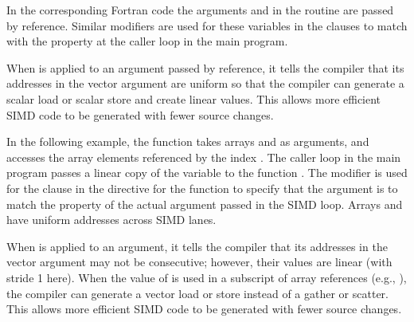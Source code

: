 In the corresponding Fortran code the arguments  and
 in the routine  are passed by reference. 
Similar modifiers are used for these variables in the  clauses
to match with the property at the caller loop in the main program.

When  is applied to an argument passed by reference, it 
tells the compiler that its addresses in the vector argument are uniform 
so that the compiler can generate a scalar load or scalar store and create 
linear values. This allows more efficient SIMD code to be generated with 
fewer source changes.


In the following example, the function  takes arrays  and  
as arguments, and accesses the array elements referenced by the index .
The caller loop  in the main program passes a linear copy of
the variable  to the function .
The  modifier is used for the  clause 
in the  directive for the function
 to specify that the argument  is to match the property of 
the actual argument  passed in the SIMD loop.
Arrays  and  have uniform addresses across SIMD lanes.

When  is applied to an argument, 
it tells the compiler that its addresses in the vector argument may not be 
consecutive; however, their values are linear (with stride 1 here). When the value of  is used 
in a subscript of array references (e.g., ), the compiler can generate 
a vector load or store instead of a gather or scatter. This allows more 
efficient SIMD code to be generated with fewer source changes.



